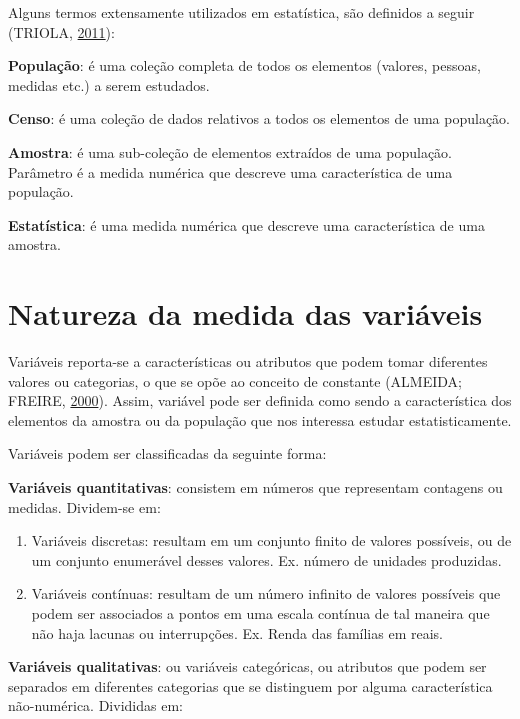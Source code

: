 \documentclass[12pt,brazil,]{book}
\begin{document}
Alguns termos extensamente utilizados em estatística, são definidos a
seguir (TRIOLA, \protect\hyperlink{ref-triola1999}{2011}):

\textbf{População}: é uma coleção completa de todos os elementos
(valores, pessoas, medidas etc.) a serem estudados.

\textbf{Censo}: é uma coleção de dados relativos a todos os elementos de
uma população.

\textbf{Amostra}: é uma sub-coleção de elementos extraídos de uma
população. Parâmetro é a medida numérica que descreve uma característica
de uma população.

\textbf{Estatística}: é uma medida numérica que descreve uma
característica de uma amostra.

\hypertarget{natureza-da-medida-das-variaveis}{%
\section{Natureza da medida das
variáveis}\label{natureza-da-medida-das-variaveis}}

Variáveis reporta-se a características ou atributos que podem tomar
diferentes valores ou categorias, o que se opõe ao conceito de constante
(ALMEIDA; FREIRE, \protect\hyperlink{ref-almeida2000}{2000}). Assim,
variável pode ser definida como sendo a característica dos elementos da
amostra ou da população que nos interessa estudar estatisticamente.

Variáveis podem ser classificadas da seguinte forma:

\textbf{Variáveis quantitativas}: consistem em números que representam
contagens ou medidas. Dividem-se em:

\begin{enumerate}
\def\labelenumi{\alph{enumi})}
\item
  Variáveis discretas: resultam em um conjunto finito de valores
  possíveis, ou de um conjunto enumerável desses valores. Ex. número de
  unidades produzidas.
\item
  Variáveis contínuas: resultam de um número infinito de valores
  possíveis que podem ser associados a pontos em uma escala contínua de
  tal maneira que não haja lacunas ou interrupções. Ex. Renda das
  famílias em reais.
\end{enumerate}

\textbf{Variáveis qualitativas}: ou variáveis categóricas, ou atributos
que podem ser separados em diferentes categorias que se distinguem por
alguma característica não-numérica. Divididas em:
\end{document}
